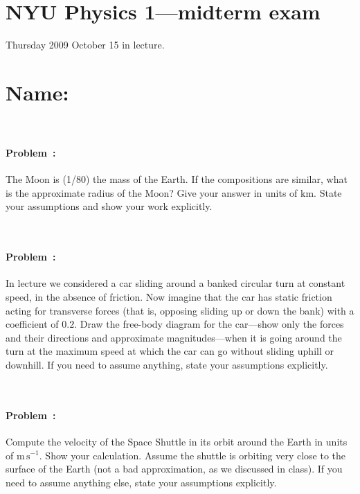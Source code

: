 \documentclass[12pt]{article}
\newcommand{\m}{\mathrm{m}}
\newcommand{\s}{\mathrm{s}}
\newcommand{\km}{\mathrm{km}}
\newcommand{\mps}{\m\,\s^{-1}}
\newcounter{problem}
\begin{document}
\section*{NYU Physics 1---midterm exam}

Thursday 2009 October 15 in lecture.

\section*{Name:}

~ \vfill ~

\clearpage

\paragraph{Problem~\theproblem:}%
The Moon is (1/80) the mass of the Earth.  If the compositions are
similar, what is the approximate radius of the Moon?  Give your answer
in units of $\km$.  State your assumptions and show your work
explicitly.

~ \vfill ~

\paragraph{Problem~\theproblem:}%
In lecture we considered a car sliding around a banked circular turn
at constant speed, in the absence of friction.  Now imagine that the
car has static friction acting for transverse forces (that is,
opposing sliding up or down the bank) with a coefficient of $0.2$.
Draw the free-body diagram for the car---show only the forces and
their directions and approximate magnitudes---when it is going around
the turn at the maximum speed at which the car can go without sliding
uphill or downhill.  If you need to assume anything, state your
assumptions explicitly.

~ \vfill ~

\clearpage

\paragraph{Problem~\theproblem:}%
Compute the velocity of the Space Shuttle in its orbit around the
Earth in units of $\mps$.  Show your calculation.  Assume the shuttle
is orbiting very close to the surface of the Earth (not a bad
approximation, as we discussed in class).  If you need to assume
anything else, state your assumptions explicitly.
\end{document}
